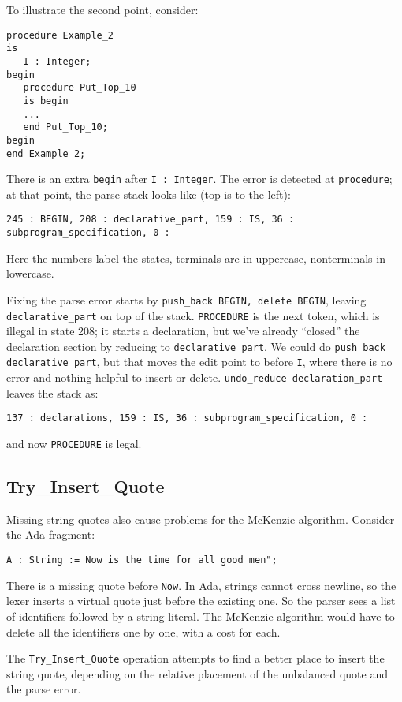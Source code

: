 \documentclass{article}
\begin{document}
To illustrate the second point, consider:
\begin{verbatim}
procedure Example_2
is
   I : Integer;
begin
   procedure Put_Top_10
   is begin
   ...
   end Put_Top_10;
begin
end Example_2;
\end{verbatim}
There is an extra \verb|begin| after
\verb|I : Integer|. The error is detected at \verb|procedure|; at that point,
the parse stack looks like (top is to the left):
\begin{verbatim}
245 : BEGIN, 208 : declarative_part, 159 : IS, 36 : subprogram_specification, 0 :
\end{verbatim}
Here the numbers label the states, terminals are in uppercase,
nonterminals in lowercase.

Fixing the parse error starts by \verb|push_back BEGIN, delete BEGIN|,
leaving \verb|declarative_part| on top of the stack. \verb|PROCEDURE|
is the next token, which is illegal in state 208; it starts a
declaration, but we've already ``closed'' the declaration section by
reducing to \verb|declarative_part|. We could do
\verb|push_back declarative_part|, but that moves the edit point to
before \verb|I|, where there is no error and nothing helpful to insert
or delete. \verb|undo_reduce declaration_part| leaves the stack as:

\begin{verbatim}
137 : declarations, 159 : IS, 36 : subprogram_specification, 0 :
\end{verbatim}
and now \verb|PROCEDURE| is legal.

\subsection{Try\_Insert\_Quote}
Missing string quotes also cause problems for the McKenzie algorithm.
Consider the Ada fragment:
\begin{verbatim}
A : String := Now is the time for all good men";
\end{verbatim}
There is a missing quote before \verb|Now|. In Ada, strings cannot
cross newline, so the lexer inserts a virtual quote just before the
existing one. So the parser sees a list of identifiers followed by a
string literal. The McKenzie algorithm would have to delete all the
identifiers one by one, with a cost for each.

The \verb|Try_Insert_Quote| operation attempts to find a better
place to insert the string quote, depending on the relative placement
of the unbalanced quote and the parse error.
\end{document}
